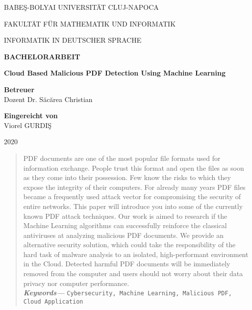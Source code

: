 \documentclass[a4paper,12pt,twoside]{report}
\providecommand{\keywords}[1]{\textbf{\textit{Keywords---}} \texttt{#1}}
\begin{document}
\begin{titlepage}
	\sloppy
	\begin{center}
		BABE\c S-BOLYAI UNIVERSIT\" AT CLUJ-NAPOCA

		FAKULT\" AT F\" UR MATHEMATIK UND INFORMATIK

		INFORMATIK IN DEUTSCHER SPRACHE

		\vspace{6cm}

		\Huge \textbf{BACHELORARBEIT}

		\vspace{0.5cm}

		\Huge \textbf{Cloud Based Malicious PDF Detection Using Machine Learning}

	\end{center}

	\vspace{3cm}

	\begin{flushleft}
		\Large{\textbf{Betreuer}}\\
		Dozent Dr. S\u{a}c\u{a}rea Christian
	\end{flushleft}

	\begin{flushright}
		\Large{\textbf{Eingereicht von}}\\
		Viorel GURDI\c S
	\end{flushright}

	\vspace{3cm}

	\begin{center}
		2020
	\end{center}
\end{titlepage}



\begin{abstract}
	PDF documents are one of the most popular file formats used for information exchange. People trust this format and open the files as soon as they come into their possession. Few know the risks to which they expose the integrity of their computers. For already many years PDF files became a frequently used attack vector for compromising the security of entire networks. This paper will introduce you into some of the currently known PDF attack techniques. Our work is aimed to research if the Machine Learning algorithms can successfully reinforce the classical antiviruses at analyzing malicious PDF documents. We provide an alternative security solution, which could take the responsibility of the hard task of malware analysis to an isolated, high-performant environment in the Cloud. Detected harmful PDF documents will be immediately removed from the computer and users should not worry about their data privacy nor computer performance. \\

	\keywords{Cybersecurity, Machine Learning, Malicious PDF, Cloud Application}
\end{abstract}
\end{document}
